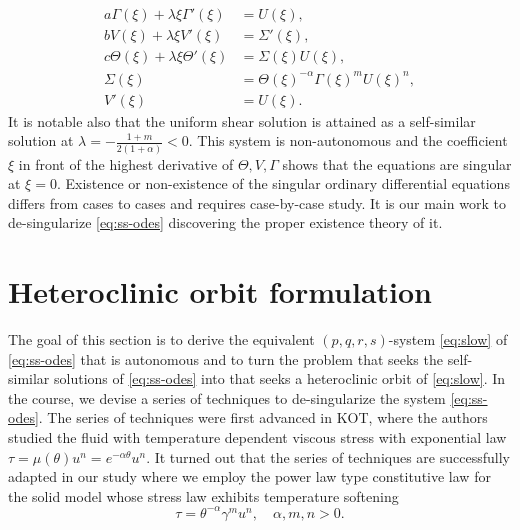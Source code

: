 \documentclass[a4paper,11pt]{article}
\begin{document}
\begin{equation}
\begin{aligned}
 a \Gamma(\xi) + \lambda \xi \Gamma'(\xi) &= U(\xi),\\
 b V(\xi) + \lambda \xi V'(\xi) &= \Sigma'(\xi),\\
 c \Theta(\xi) + \lambda \xi \Theta'(\xi)&=\Sigma(\xi) U(\xi),\\
 \Sigma(\xi) &= \Theta(\xi)^{-\alpha} \Gamma(\xi)^m U(\xi)^n,\\
 V'(\xi)&=U(\xi).
\end{aligned} \label{eq:ss-odes}
\end{equation}
It is notable also that the uniform shear solution is attained as a self-similar solution at $\lambda = -\frac{1+m}{2(1+\alpha)}<0$. 
This system is non-autonomous and the coefficient $\xi$ in front of the highest derivative of $\Theta, V, \Gamma$ shows that the equations are singular at $\xi=0$. Existence or non-existence of the singular ordinary differential equations differs from cases to cases and requires case-by-case study. %
It is our main work to de-singularize \eqref{eq:ss-odes} discovering the proper existence theory of it. 

\section{Heteroclinic orbit formulation} \label{sec:formulation}
The goal of this section is to derive the equivalent $(p,q,r,s)$-system \eqref{eq:slow} of \eqref{eq:ss-odes} that is autonomous and to turn the problem that seeks the self-similar solutions of \eqref{eq:ss-odes} into that seeks a heteroclinic orbit of \eqref{eq:slow}. In the course, we devise a series of techniques to de-singularize the system \eqref{eq:ss-odes}. The series of techniques were first advanced in KOT, where the authors studied the fluid with temperature dependent viscous stress with exponential law $ \tau = \mu(\theta)u^n = e^{-\alpha\theta} u^n.$
It turned out that the series of techniques are successfully adapted in our study where we employ the power law type constitutive law for the solid model whose stress law exhibits temperature softening
$$ \tau = \theta^{-\alpha}\gamma^{m}u^n, \quad \alpha,m,n>0.$$
\end{document}

